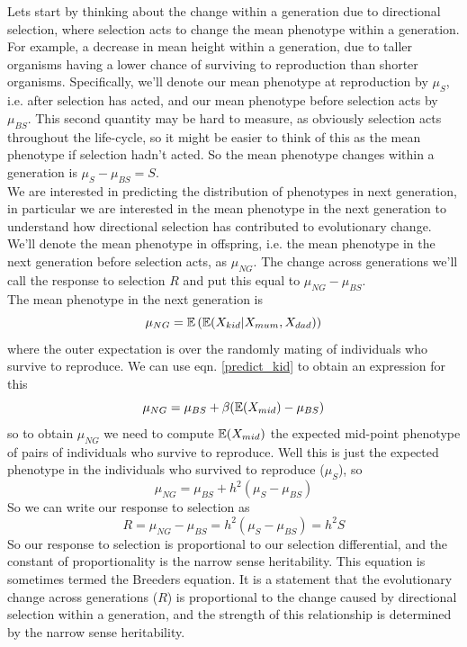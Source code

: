 Lets start by thinking about the change within a generation due
to directional selection, where selection acts to change the mean
phenotype within a generation. For example, a decrease in mean height within a
generation, due to taller organisms having a lower chance of surviving
to reproduction than shorter organisms. Specifically, we'll denote our mean phenotype at
reproduction by $\mu_S$, i.e. after selection has acted, and our mean
phenotype before selection acts by $\mu_{BS}$. This second quantity may be hard to
measure, as obviously selection acts throughout the life-cycle, so it
might be easier to think of this as the mean phenotype if selection
hadn't acted. So the mean phenotype changes within a generation is $\mu_{S} - \mu_{BS}= S$.  \\

We are interested in predicting the distribution of phenotypes in next
generation, in particular we are interested in the mean phenotype in
the next generation to understand how directional selection has
contributed to evolutionary change. We'll denote the mean phenotype in
offspring, i.e. the mean phenotype in the next generation before selection acts,
as $\mu_{NG}$. The change across generations we'll call the response
to selection $R$ and put this equal to $\mu_{NG}- \mu_{BS}$. \\

The mean phenotype in the next generation is
\begin{equation}
\mu_{NG} = \mathbb{E} \left( \mathbb{E}(X_{kid} | X_{mum},X_{dad}) \right)
\end{equation}
where the outer expectation is over the randomly mating of individuals
who survive to reproduce. We can use eqn. \ref{predict_kid} to obtain
an expression for this
\begin{equation}
\mu_{NG} = \mu_{BS} +
\beta ( \mathbb{E}(X_{mid}) - \mu_{BS})
\end{equation}
so to obtain $\mu_{NG}$ we need to compute $\mathbb{E}(X_{mid})$ the expected
mid-point phenotype of pairs of individuals who survive to
reproduce. Well this is just the expected phenotype in the individuals
who survived to reproduce ($\mu_{S}$), so
\begin{equation}
\mu_{NG} = \mu_{BS} +
h^2 (\mu_S - \mu_{BS})
\end{equation}
So we can write our response to selection as
\begin{equation}
R = \mu_{NG} -\mu_{BS}  =
h^2 (\mu_S - \mu_{BS}) = h^2 S \label{breeders_eqn}
\end{equation}
So our response to selection is proportional to our selection
differential, and the constant of proportionality is the narrow sense
heritability. This equation is sometimes termed the Breeders
equation. It is a statement that the evolutionary change across
generations ($R$) is proportional to the change caused by directional selection
within a generation, and the strength of this relationship is
determined by the narrow sense heritability. \\

